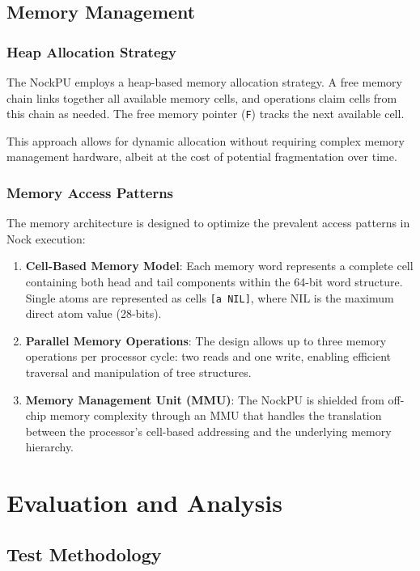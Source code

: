 \documentclass[twoside]{article}
\begin{document}
\subsection{Memory Management}

\subsubsection{Heap Allocation Strategy}

The NockPU employs a heap-based memory allocation strategy. A free memory chain links together all available memory cells, and operations claim cells from this chain as needed. The free memory pointer (\texttt{F}) tracks the next available cell.

This approach allows for dynamic allocation without requiring complex memory management hardware, albeit at the cost of potential fragmentation over time.

\subsubsection{Memory Access Patterns}

The memory architecture is designed to optimize the prevalent access patterns in Nock execution:

\begin{enumerate}
  \item \textbf{Cell-Based Memory Model}: Each memory word represents a complete cell containing both head and tail components within the 64-bit word structure. Single atoms are represented as cells \texttt{[a NIL]}, where NIL is the maximum direct atom value (28-bits).
  \item \textbf{Parallel Memory Operations}: The design allows up to three memory operations per processor cycle: two reads and one write, enabling efficient traversal and manipulation of tree structures.
  \item \textbf{Memory Management Unit (MMU)}: The NockPU is shielded from off-chip memory complexity through an MMU that handles the translation between the processor's cell-based addressing and the underlying memory hierarchy.
\end{enumerate}

\section{Evaluation and Analysis}

\subsection{Test Methodology}
\end{document}
